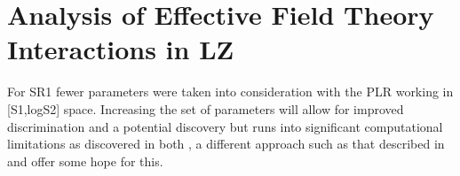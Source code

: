 \chapter{Analysis of Effective Field Theory Interactions in LZ}
\label{chap:eft_work}







%

%

For SR1 fewer parameters were taken into consideration with the PLR working in [S1,logS2] space.
Increasing the set of parameters will allow for improved discrimination and a potential discovery but runs into significant computational limitations as discovered in both \cite{nicolelarsen_thesis_ref, shaunalsum_thesis_ref, billyboxer_thesis_ref}, a different approach such as that described in \cite{flamenest_ref} and \cite{lux_ml_plr_ref} offer some hope for this.